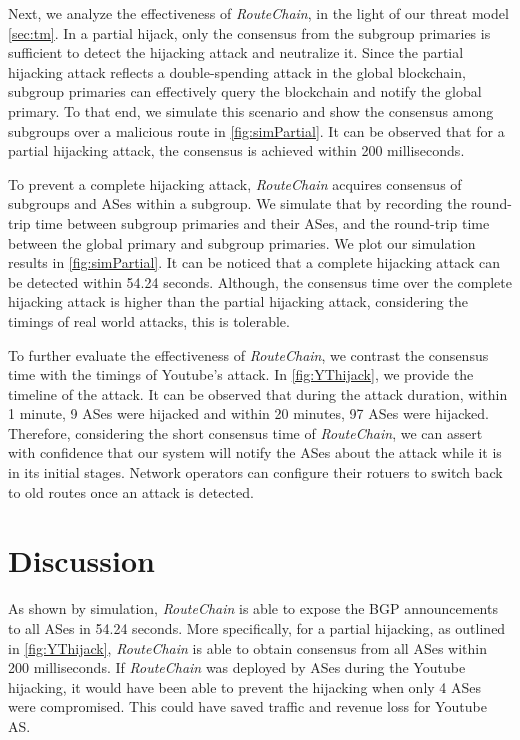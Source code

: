 \documentclass[5p]{elsarticle}
\newcommand{\rc}{{{\em RouteChain}}\xspace}
\begin{document}
Next, we analyze the effectiveness of \rc, in the light of our threat model \textsection\ref{sec:tm}. In a  partial hijack, only the consensus from the subgroup primaries is sufficient to detect the hijacking attack and neutralize it. Since the partial hijacking attack reflects a double-spending attack in the global blockchain, subgroup primaries can effectively query the blockchain and notify the global primary. To that end, we simulate this scenario and show the consensus among subgroups over a malicious route in \autoref{fig:simPartial}. It can be observed that for a partial hijacking attack, the consensus is achieved within 200 milliseconds. 

To prevent a complete hijacking attack, \rc acquires consensus of subgroups and ASes within a subgroup. We simulate that by recording the round-trip time between subgroup primaries and their ASes, and the round-trip time between the global primary and subgroup primaries. We plot our simulation results in \autoref{fig:simPartial}. It can be noticed that a complete hijacking attack can be detected within 54.24 seconds. Although, the consensus time over the complete hijacking attack is higher than the partial hijacking attack, considering the timings of real world attacks, this is tolerable. 

To further evaluate the effectiveness of \rc, we contrast the consensus time with the timings of Youtube's attack. In \autoref{fig:YThijack}, we provide the timeline of the attack. It can be observed that during the attack duration, within 1 minute, 9 ASes were hijacked and within 20 minutes, 97 ASes were hijacked. Therefore, considering the short consensus time of \rc, we can assert with confidence that our system will notify the ASes about the attack while it is in its initial stages. Network operators can configure their rotuers to switch back to old routes once an attack is detected. 

\section{Discussion}\label{sec:discussion}
As shown by simulation, \rc is able to expose the BGP announcements to all ASes in 54.24 seconds. More specifically, for a partial hijacking, as outlined in \autoref{fig:YThijack}, \rc is able to obtain consensus from all ASes within 200 milliseconds. If \rc was deployed by ASes during the Youtube hijacking, it would have been able to prevent the hijacking when only 4 ASes were compromised. This could have saved traffic and revenue loss for Youtube AS. 
\end{document}
